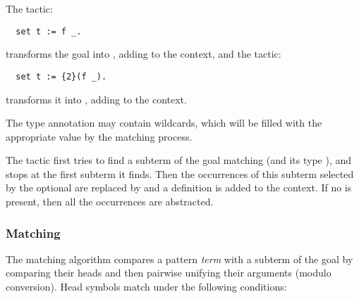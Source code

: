 The tactic:
\begin{lstlisting}
  set t := f _.
\end{lstlisting}
transforms the goal   into , adding
 to the context, and the tactic:
\begin{lstlisting}
  set t := {2}(f _).
\end{lstlisting}
transforms it into , adding  to the context.

The type annotation  may
contain wildcards, which will be filled with the appropriate value by
the matching process.

The tactic first tries to find a subterm of the goal matching
 (and its type ),
and stops at the first subterm it finds. Then the occurrences
of this subterm selected by the optional  are replaced
by  and a definition  \ssrC{:=} {\term} is added to
the context. If no  is present, then all the
occurrences are abstracted.

\subsubsection*{Matching}

The matching algorithm compares a pattern \textit{term}
 with a subterm of the goal by comparing their heads
and then pairwise unifying their arguments (modulo conversion). Head
symbols match under the following conditions:

